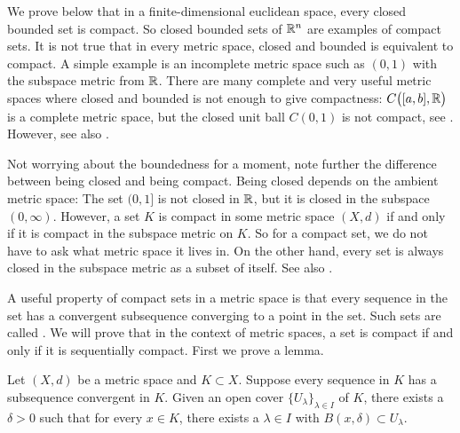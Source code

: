We prove below that 
in a finite-dimensional euclidean space,
every closed bounded set is compact.
So closed bounded sets
of ${\mathbb{R}}^n$ are examples of compact sets.
It is not true that in every metric space, closed and bounded is equivalent
to compact.  A simple example is an incomplete metric space such as
$(0,1)$ with the subspace metric from ${\mathbb{R}}$.
There are many complete and very useful metric spaces
where closed and bounded is not
enough to give compactness: $C\bigl([a,b],{\mathbb{R}}\bigr)$ is a complete metric
space, but the closed unit ball $C(0,1)$ is not compact, see
.  However, see also
.

Not worrying about the boundedness for a moment,
note further the difference between being closed and being compact.  Being
closed depends on the ambient metric space:
The set $(0,1]$ is not closed in ${\mathbb{R}}$,
but it is closed in the subspace $(0,\infty)$.
However, a set $K$ is compact
in some metric space $(X,d)$ if and only if it is compact in the subspace
metric on $K$.  So for a compact set, we do not have to ask
what metric space it lives in.
On the other hand, every set is always closed in the 
subspace metric as a subset of itself.
See also .

A useful property of compact sets in a metric space is that every
sequence in the set has a convergent subsequence converging
to a point in the set.
Such sets are called
\emph{}.
We will prove that in the
context of metric spaces, a set is compact if and only if it is sequentially
compact.
First we prove a lemma.

\begin{lemma}\label{ms:lebesgue}
Let $(X,d)$ be a metric space and $K \subset X$.  Suppose 
every sequence in $K$ has a subsequence convergent in $K$.  Given
an open cover $\{ U_\lambda \}_{\lambda \in I}$ of $K$, there exists a
$\delta > 0$ such that for every $x \in K$, there exists a $\lambda \in I$
with $B(x,\delta) \subset U_\lambda$.
\end{lemma}

